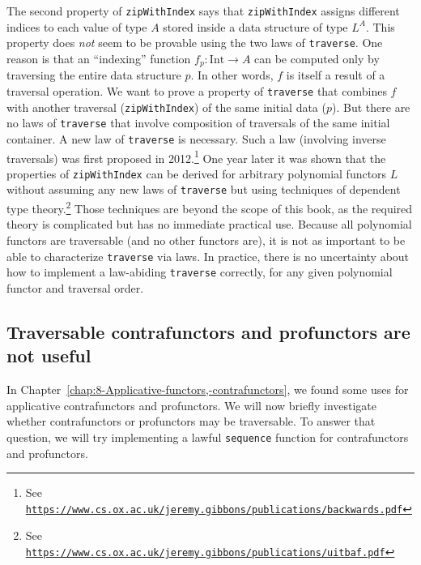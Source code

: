 The second property of \lstinline!zipWithIndex! says that \lstinline!zipWithIndex!
assigns different indices to each value of type $A$ stored inside
a data structure of type $L^{A}$. This property does \emph{not} seem
to be provable using the two laws of \lstinline!traverse!. One reason
is that an \textsf{``}indexing\textsf{''} function $f_{p}:\text{Int}\rightarrow A$
can be computed only by traversing the entire data structure $p$.
In other words, $f$ is itself a result of a traversal operation.
We want to prove a property of \lstinline!traverse! that combines
$f$ with another traversal (\lstinline!zipWithIndex!) of the same
initial data ($p$). But there are no laws of \lstinline!traverse!
that involve composition of traversals of the same initial container.
A new law of \lstinline!traverse! is necessary. Such a law (involving
inverse traversals) was first proposed in 2012.\footnote{See \texttt{\href{https://www.cs.ox.ac.uk/jeremy.gibbons/publications/backwards.pdf}{https://www.cs.ox.ac.uk/jeremy.gibbons/publications/backwards.pdf}}}
One year later it was shown that the properties of \lstinline!zipWithIndex!
can be derived for arbitrary polynomial functors $L$ without assuming
any new laws of \lstinline!traverse! but using techniques of dependent
type theory.\footnote{See \texttt{\href{https://www.cs.ox.ac.uk/jeremy.gibbons/publications/uitbaf.pdf}{https://www.cs.ox.ac.uk/jeremy.gibbons/publications/uitbaf.pdf}}}
Those techniques are beyond the scope of this book, as the required
theory is complicated but has no immediate practical use. Because
all polynomial functors are traversable (and no other functors are),
it is not as important to be able to characterize \lstinline!traverse!
via laws. In practice, there is no uncertainty about how to implement
a law-abiding \lstinline!traverse! correctly, for any given polynomial
functor and traversal order.

\subsection{Traversable contrafunctors and profunctors are not useful}

In Chapter~\ref{chap:8-Applicative-functors,-contrafunctors}, we
found some uses for applicative contrafunctors and profunctors. We
will now briefly investigate whether contrafunctors or profunctors
may be traversable. To answer that question, we will try implementing
a lawful \lstinline!sequence! function for contrafunctors and profunctors.

